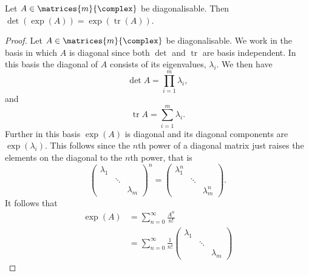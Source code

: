 \documentclass[fleqn]{NotesClass}
\DeclareMathOperator{\tr}{tr}
\begin{document}
    \begin{lma}{}{}
        Let \(A \in \matrices{m}{\complex}\) be diagonalisable.
        Then \(\det(\exp(A)) = \exp(\tr(A))\).
        \begin{proof}
            Let \(A \in \matrices{m}{\complex}\) be diagonalisable.
            We work in the basis in which \(A\) is diagonal since both \(\det\) and \(\tr\) are basis independent.
            In this basis the diagonal of \(A\) consists of its eigenvalues, \(\lambda_i\).
            We then have
            \begin{equation}
                \det A = \prod_{i = 1}^{m} \lambda_i,
            \end{equation}
            and
            \begin{equation}
                \tr A = \sum_{i = 1}^{m} \lambda_i.
            \end{equation}
            Further in this basis \(\exp(A)\) is diagonal and its diagonal components are \(\exp(\lambda_i)\).
            This follows since the \(n\)th power of a diagonal matrix just raises the elements on the diagonal to the \(n\)th power, that is
            \begin{equation}
                \begin{pmatrix}
                    \lambda_1 &&\\
                    &\ddots &\\
                    && \lambda_m
                \end{pmatrix}
                ^n = 
                \begin{pmatrix}
                    \lambda_1^n &&\\
                    &\ddots &\\
                    && \lambda_m^n
                \end{pmatrix}
                .
            \end{equation}
            It follows that
            \begingroup
            \allowdisplaybreaks
            \begin{align}
                \exp(A) &= \sum_{n = 0}^{\infty} \frac{A^n}{n!}\\
                &= \sum_{n = 0}^{\infty} \frac{1}{n!} 
                \begin{pmatrix}
                    \lambda_1 && \\
                    & \ddots & \\
                    && \lambda_m
                \end{pmatrix}

\end{align}
\end{proof}
\end{lma}
\end{document}
